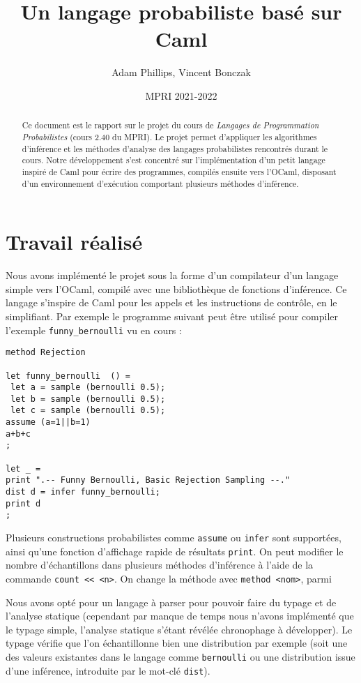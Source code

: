 \documentclass[svgnames]{article}
\begin{document}
\title{Un langage probabiliste basé sur Caml}

\author{Adam Phillips, Vincent Bonczak}

\date{MPRI 2021-2022}

\maketitle

\begin{abstract}
Ce document est le rapport sur le projet du cours de \emph{Langages de Programmation Probabilistes} (cours 2.40 du MPRI). 
Le projet permet d'appliquer les algorithmes d'inférence et les méthodes d'analyse des langages probabilistes rencontrés durant le cours. 
Notre développement s'est concentré sur l'implémentation d'un petit langage inspiré de Caml pour écrire des programmes, compilés ensuite vers
l'OCaml, disposant d'un environnement  d'exécution comportant plusieurs méthodes d'inférence.
\end{abstract}

\section{Travail réalisé}

Nous avons implémenté le projet sous la forme d'un compilateur d'un langage simple vers l'OCaml, compilé avec une bibliothèque de fonctions d'inférence.
Ce langage s'inspire de Caml pour les appels et les instructions de contrôle, en le simplifiant. Par exemple le programme suivant peut être utilisé pour compiler l'exemple \verb|funny_bernoulli| vu en cours :
\begin{lstlisting}
method Rejection

let funny_bernoulli  () =  
 let a = sample (bernoulli 0.5);
 let b = sample (bernoulli 0.5);  
 let c = sample (bernoulli 0.5); 
assume (a=1||b=1)
a+b+c
;

let _ = 
print ".-- Funny Bernoulli, Basic Rejection Sampling --."
dist d = infer funny_bernoulli;
print d
;
\end{lstlisting}

 
Plusieurs constructions probabilistes comme \verb|assume| ou \verb|infer| sont supportées, ainsi qu'une fonction d'affichage rapide de résultats \verb|print|.
On peut modifier le nombre d'échantillons dans plusieurs méthodes d'inférence à l'aide de la commande \lstinline|count << <n>|.
On change la méthode avec \lstinline|method <nom>|, parmi 

Nous avons opté pour un langage à parser pour pouvoir faire du typage et de l'analyse statique (cependant par manque de temps nous n'avons implémenté que le typage simple, l'analyse statique s'étant révélée chronophage à développer).
Le typage vérifie que l'on échantillonne bien une distribution par exemple (soit une des valeurs existantes dans le langage comme \verb|bernoulli| ou une distribution issue d'une inférence, introduite par le mot-clé \lstinline{dist}).
\end{document}
